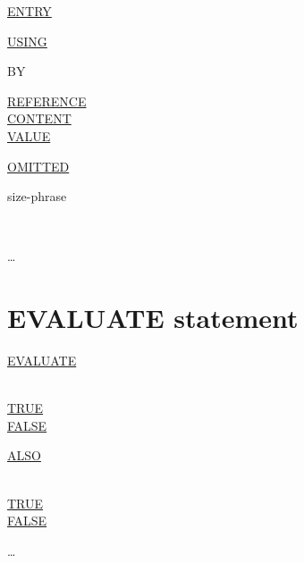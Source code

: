 \documentclass[a4paper,oneside,svgnames]{scrbook}
\makeatletter
\newcommand{\key}[1]{\underline{#1}}
\newcommand{\gnucobol}[1]{%
  \colorbox{orange!75}{#1}}
\newcommand{\miscext}[1]{%
  \colorbox{blue!50}{#1}}
\newenvironment{0-1}{$\left[ \begin{tabular}{@{}l@{}}}{\end{tabular} \right]$}
\newenvironment{1=}{$\left\{ \begin{tabular}{@{}l@{}}}{\end{tabular} \right\}$}
\makeatother
\begin{document}
\miscext{
  \begin{minipage}[!h]{1.0\linewidth}
    \key{ENTRY} \literal

    \begin{0-1}
      \key{USING}

      \begin{1=}
        \begin{0-1}
          BY
          \begin{1=}
            \key{REFERENCE} \\
            \gnucobol{\key{CONTENT}} \\
            \key{VALUE}
          \end{1=}
        \end{0-1}

        \begin{1=}
          \gnucobol{\key{OMITTED}} \\

          \begin{1=}
            \gnucobol{
              \begin{0-1}
                size-phrase
              \end{0-1}
            }
            \begin{1=}
              \identifier \\
              \literal
            \end{1=}
          \end{1=}
        \end{1=}\ldots
      \end{1=}
    \end{0-1}
  \end{minipage}
}

\section{EVALUATE statement}

\key{EVALUATE}
\begin{1=}
  \expression \\
  \key{TRUE} \\
  \key{FALSE}
\end{1=}
\begin{0-1}
  \key{ALSO}
  \begin{1=}
    \expression \\
    \key{TRUE} \\
    \key{FALSE}
  \end{1=}
\end{0-1} \ldots
\end{document}
